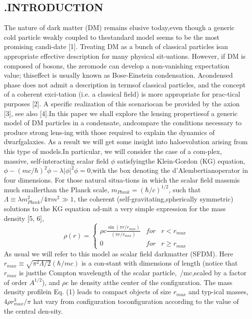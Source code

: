 \documentclass{article}\newcommand\Star[1]{#1\textsuperscript{*}}
\begin{document}
	\begin{multicols}{2}
        \section{.INTRODUCTION}
		The nature of dark matter (DM) remains elusive today,even though a generic cold particle weakly coupled to thestandard model seems to be the most promising candi-date [1].  Treating DM as a bunch of classical particles isan appropriate effective description for many physical sit-uations.  However, if DM is composed of bosons, the zeromode can develop a non-vanishing expectation value; thiseffect is usually known as Bose-Einstein condensation.  Acondensed phase does not admit a description in termsof classical particles, and the concept of a coherent exci-tation (i.e.  a classical field) is more appropriate for prac-tical purposes [2].  A specific realization of this scenariocan be provided by the axion [3], see also [4].In  this  paper  we  shall  explore  the  lensing  propertiesof a generic model of DM particles in a condensate, andcompare the conditions necessary to produce strong lens-ing with those required to explain the dynamics of dwarfgalaxies.  As a result we will get some insight into haloevolution arising from this type of models.In  particular,  we  will  consider  the  case  of  a  com-plex,  massive,  self-interacting  scalar  field \(\phi \) satisfyingthe  Klein-Gordon (KG) equation, \(\phi - (mc/\hbar)^2 \phi - \lambda|\phi|^2\phi = 0\),with  the  box  denoting  the  d’Alembertianoperator  in  four  dimensions.   For  those  natural  situa-tions  in  which  the  scalar  field  massmis  much  smallerthan  the  Planck  scale, \(m_{Plank}=(\hbar/c)^{1/2}\), such that \(\Lambda\equiv\lambda m_{Plank}^{2}/4\pi m^{2}\gg1\), the coherent (self-gravitating,spherically symmetric) solutions to the KG equation ad-mit a very simple expression for the mass density [5, 6], 
		\begin{equation} \label{eq:1}
		\rho(r)= \left\{ \begin{array}{lcc}
		\rho c\frac{\sin(\pi r/r_{max})}{(\pi r/r_{max})} 
		&   for  &   r< r_{max}
		\\ 0 &  for & r\geq r_{max} 
	\end{array} \right. 
		\end{equation}
	As usual we will refer to this model as scalar field darkmatter (SFDM). Here \(r_{max}\equiv\sqrt{\pi^{2}\Lambda/2}(\hbar/mc)\) is a con-stant with dimensions of length (notice that \(r_{max}\) is justthe  Compton  wavelength  of  the  scalar  particle,~/mc,scaled by a factor of order \(A^{1/2}\)), and \(\rho c\) he density atthe center of the configuration.  The mass density profilein Eq. (1) leads to compact objects of size \(r_{max}\) and typ-ical masses, \(4\rho r^{3}_{max}/\pi\) hat vary from configuration toconfiguration according to the value of the central den-sity.\\

\end{multicols}
\end{document}
